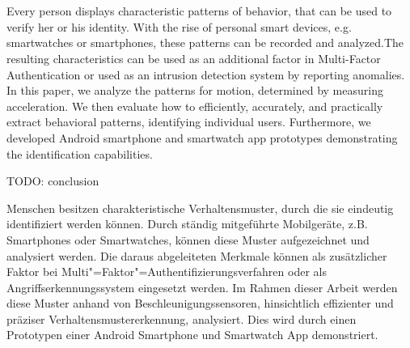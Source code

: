 \chapter{\abstractname}
Every person displays characteristic patterns of behavior, that can be used to verify her or his identity. With the rise of personal smart devices, e.g. smartwatches or smartphones, these patterns can be recorded and analyzed.The resulting characteristics can be used as an additional factor in Multi-Factor Authentication or used as an intrusion detection system by reporting anomalies.
In this paper, we analyze the patterns for motion, determined by measuring acceleration. We then evaluate how to efficiently, accurately, and practically extract behavioral patterns, identifying individual users. Furthermore, we developed Android smartphone and smartwatch app prototypes demonstrating the identification capabilities.

TODO: conclusion

\vspace{3cm}
Menschen besitzen charakteristische Verhaltensmuster, durch die sie eindeutig identifiziert werden können. Durch ständig mitgeführte Mobilgeräte, z.B. Smartphones oder Smartwatches, können diese Muster aufgezeichnet und analysiert werden. Die daraus abgeleiteten Merkmale können als zusätzlicher Faktor bei Multi"=Faktor"=Authentifizierungsverfahren oder als Angriffserkennungssystem eingesetzt werden.
Im Rahmen dieser Arbeit werden diese Muster anhand von Beschleunigungssensoren, hinsichtlich effizienter und präziser Verhaltensmustererkennung, analysiert. Dies wird durch einen Prototypen einer Android Smartphone und Smartwatch App demonstriert.
